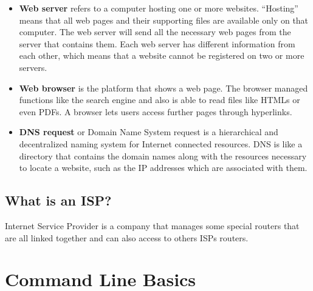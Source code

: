 \documentclass{article}
\begin{document}
\begin{itemize}
		\item \textbf{Web server} refers to a computer hosting one or more websites. ``Hosting'' means that all web pages and their supporting files are available only on that computer. The web server will send all the necessary web pages from the server that contains them. Each web server has different information from each other, which means that a website cannot be registered on two or more servers.
		
		\item \textbf{Web browser} is the platform that shows a web page. The browser managed functions like the search engine and also is able to read files like HTMLs or even PDFs. A browser lets users access further pages through hyperlinks.
		
		\item \textbf{DNS request} or Domain Name System request is a hierarchical and decentralized naming system for Internet connected resources. DNS is like a directory that contains the domain names along with the resources necessary to locate a website, such as the IP addresses which are associated with them.
	\end{itemize}
    
    \subsection{What is an ISP?}
    
    Internet Service Provider is a company that manages some special routers that are all linked together and can also access to others ISPs routers.
    
    \section{Command Line Basics}
    
\end{document}
